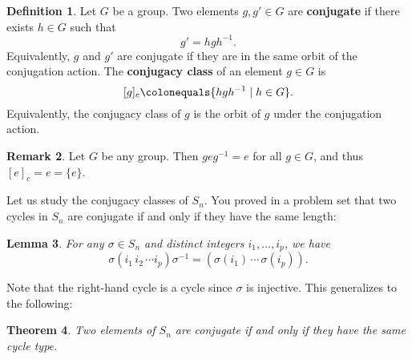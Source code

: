 \documentclass[12pt]{report}
\newtheorem{theorem}{Theorem}[chapter]
\newtheorem{lemma}[theorem]{Lemma}
\numberwithin{equation}{section}
\numberwithin{theorem}{chapter}
\theoremstyle{definition}
\newtheorem{definition}[theorem]{Definition}
\newtheorem*{basic properties}{Basic Properties}
\newtheorem*{Important Remark}{Important Remark}
\newtheorem{remark}[theorem]{Remark}
\newcommand{\df}[1]{{\bf #1}\index{#1}}
\begin{document}
\begin{definition}
Let $G$ be a group. Two elements $g,g' \in G$ are {\bf conjugate} if there exists $h \in G$ such that 
$$g' = hgh^{-1}.$$
Equivalently, $g$ and $g'$ are conjugate if they are in the same orbit of the conjugation action. The \df{conjugacy class} of an element $g \in G$ is 
$$[g]_c \colonequals \{hgh^{-1} \mid h \in G\}.$$ 
Equivalently, the conjugacy class of $g$ is the orbit of $g$ under the conjugation action. 
\end{definition}


\begin{remark}
	Let $G$ be any group. Then $geg^{-1} = e$ for all $g \in G$, and thus $[e]_c=e = \{ e \}$.
\end{remark}

Let us study the conjugacy classes of $S_n$. You proved in a problem set that two cycles in $S_n$ are conjugate if and only if they have the same length:

\begin{lemma}\label{lemma conjugates cycles} 
For any $\sigma \in S_n$ and distinct integers $i_1, \dots, i_p$, we have
$$\sigma (i_1 \, i_2 \, \cdots i_p) \sigma^{-1} = (\sigma(i_1) \, \cdots \, \sigma(i_p)).$$
\end{lemma}

Note that the right-hand cycle is a cycle since $\sigma$ is injective. This generalizes to the following:

\begin{theorem}\label{conjugates S_n}
Two elements of $S_n$ are conjugate if and only if they have the same cycle type. 
\end{theorem}

\end{document}
